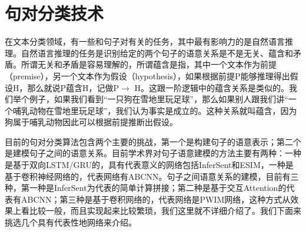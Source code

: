 \documentclass[twoside,a4paper,12pt]{book}%
\begin{document}
\section{句对分类技术}
在文本分类领域，有一些和句子对有关的任务，其中最有影响力的是自然语言推理。自然语言推理的任务是识别给定的两个句子的语意关系是不是无关、蕴含和矛盾。所谓无关和矛盾是容易理解的，所谓蕴含是指，其中一个文本作为前提（premise），另一个文本作为假设（hypothesis），如果根据前提P能够推理得出假设H，那么就说P蕴含H，记做P$\rightarrow$ H。这跟一阶逻辑中的蕴含关系是类似的。我们举个例子，如果我们看到“一只狗在雪地里玩足球”，那么如果别人跟我们讲“一个哺乳动物在雪地里玩足球”，我们认为事实是成立的。这种关系就叫蕴含，因为狗属于哺乳动物因此可以根据前提推断出假设。
\begin{table}[h]
	\caption{自然语言推理任务的句对关系}  
	\label{tab:schedule}
	\centering
\end{table}

目前的句对分类算法包含两个主要的挑战，第一个是构建句子的语意表示；第二个是建模句子之间的语意关系。目前学术界对句子语意建模的方法主要有两种：一种是基于双向\gls{LSTM}/\gls{GRU}的，具有代表意义的网络包括InferSent和ESIM，一种是基于卷积神经网络的，代表网络有ABCNN。句子之间语意关系的建模，目前有三种，第一种是InferSent为代表的简单计算拼接；第二种是基于交互Attention的代表有ABCNN；第三种是基于卷积网络的，代表网络是PWIM网络，这种方式从效果上看比较一般，而且实现起来比较繁琐，我们这里就不详细介绍了。我们下面来挑选几个具有代表性地网络来介绍。
\end{document}
